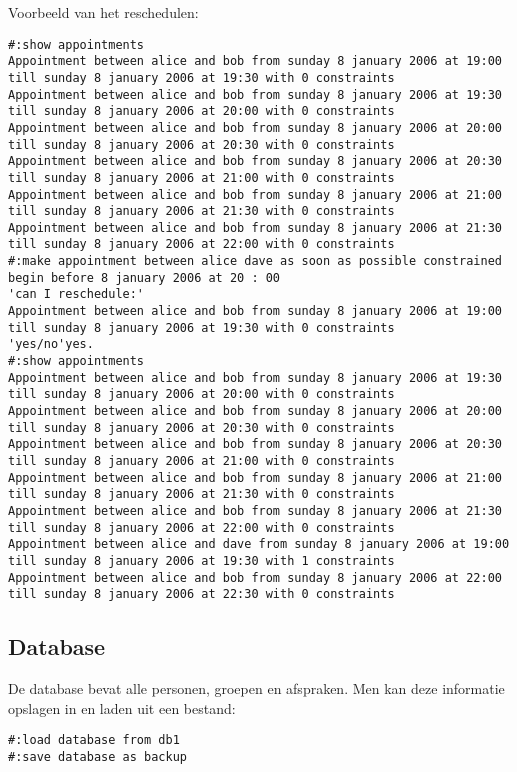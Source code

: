 \documentclass[a4paper]{article}
\begin{document}
Voorbeeld van het reschedulen:

\begin{verbatim}
#:show appointments
Appointment between alice and bob from sunday 8 january 2006 at 19:00 
till sunday 8 january 2006 at 19:30 with 0 constraints 
Appointment between alice and bob from sunday 8 january 2006 at 19:30 
till sunday 8 january 2006 at 20:00 with 0 constraints 
Appointment between alice and bob from sunday 8 january 2006 at 20:00 
till sunday 8 january 2006 at 20:30 with 0 constraints 
Appointment between alice and bob from sunday 8 january 2006 at 20:30 
till sunday 8 january 2006 at 21:00 with 0 constraints 
Appointment between alice and bob from sunday 8 january 2006 at 21:00 
till sunday 8 january 2006 at 21:30 with 0 constraints 
Appointment between alice and bob from sunday 8 january 2006 at 21:30 
till sunday 8 january 2006 at 22:00 with 0 constraints 
#:make appointment between alice dave as soon as possible constrained 
begin before 8 january 2006 at 20 : 00
'can I reschedule:'
Appointment between alice and bob from sunday 8 january 2006 at 19:00 
till sunday 8 january 2006 at 19:30 with 0 constraints 
'yes/no'yes.
#:show appointments
Appointment between alice and bob from sunday 8 january 2006 at 19:30 
till sunday 8 january 2006 at 20:00 with 0 constraints 
Appointment between alice and bob from sunday 8 january 2006 at 20:00 
till sunday 8 january 2006 at 20:30 with 0 constraints 
Appointment between alice and bob from sunday 8 january 2006 at 20:30 
till sunday 8 january 2006 at 21:00 with 0 constraints 
Appointment between alice and bob from sunday 8 january 2006 at 21:00 
till sunday 8 january 2006 at 21:30 with 0 constraints 
Appointment between alice and bob from sunday 8 january 2006 at 21:30 
till sunday 8 january 2006 at 22:00 with 0 constraints 
Appointment between alice and dave from sunday 8 january 2006 at 19:00 
till sunday 8 january 2006 at 19:30 with 1 constraints 
Appointment between alice and bob from sunday 8 january 2006 at 22:00 
till sunday 8 january 2006 at 22:30 with 0 constraints 
\end{verbatim}

\subsection{Database}
De database bevat alle personen, groepen en afspraken.
Men kan deze informatie opslagen in en laden uit een bestand:
\begin{verbatim}
#:load database from db1
#:save database as backup
\end{verbatim}
\end{document}
